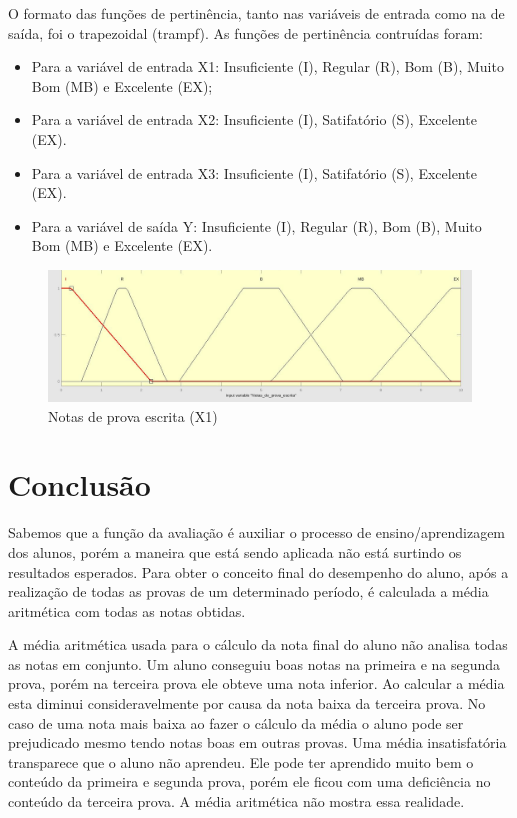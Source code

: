 \documentclass{article}
\begin{document}
O formato das funções de pertinência, tanto nas variáveis 
de entrada como na de saída, foi o trapezoidal (trampf). As
funções de pertinência contruídas foram:

\begin{itemize}
    \item Para a variável de entrada X1: Insuficiente (I),
    Regular (R), Bom (B), Muito Bom (MB) e Excelente (EX);
    \item Para a variável de entrada X2:  Insuficiente  (I),
    Satifatório (S), Excelente (EX). 
    \item Para a variável de entrada X3: Insuficiente  (I),
    Satifatório (S), Excelente (EX). 
    \item Para a variável de saída Y: Insuficiente (I), 
    Regular (R), Bom (B), Muito Bom (MB) e Excelente (EX).
\end{itemize}


\begin{figure}[h!]
\centering
\includegraphics[scale=.2]{X1.png}
\caption{Notas de prova escrita (X1)}
\label{fig:notas_de_provas_escritas}
\end{figure}

\section{Conclusão}
Sabemos que a função da avaliação é auxiliar o processo de
ensino/aprendizagem dos alunos, porém a maneira que está sendo
aplicada não está surtindo os resultados esperados. Para obter
o conceito final do desempenho do aluno, após a realização
de todas as provas de um determinado período, é calculada a
média aritmética com todas as notas obtidas.

A média aritmética usada para o cálculo da nota final
do aluno não analisa todas as notas em conjunto. Um aluno
conseguiu boas notas na primeira e na segunda prova, porém
na terceira prova ele obteve uma nota inferior. Ao calcular
a média esta diminui consideravelmente por causa da nota
baixa da terceira prova. No caso de uma nota mais baixa ao
fazer o cálculo da média o aluno pode ser prejudicado mesmo
tendo notas boas em outras provas. Uma média insatisfatória
transparece que o aluno não aprendeu. Ele pode ter aprendido
muito bem o conteúdo da primeira e segunda prova, porém ele
ficou com uma deficiência no conteúdo da terceira prova. A
média aritmética não mostra essa realidade.
\end{document}
